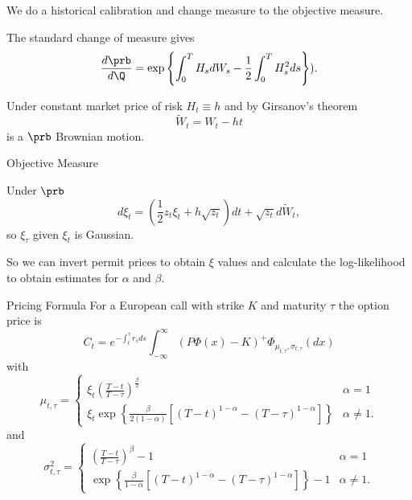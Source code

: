 
	We do a historical calibration and change measure to the objective measure.

	The standard change of measure gives
$$
\frac{d\prb}{d\Q} = \exp\left\{\int_0^T H_s dW_s -\frac{1}{2} \int_0^T H_s^2ds \right\}).
$$

Under constant market price of risk $H_t \equiv h$ and by Girsanov's theorem
$$
\tilde{W}_t = W_t - ht
$$
is a $\prb$ Brownian motion.


{Objective Measure}


Under $\prb$
$$
d\xi_t = \left(\frac{1}{2} z_t \xi_t + h \sqrt{z_t} \right)dt + \sqrt{z_t} d\tilde{W}_t,
$$
so $\xi_{\tau}$ given $\xi_t$ is Gaussian.

	So we can invert permit prices to obtain $\xi$ values and calculate the log-likelihood to obtain
estimates for $\alpha$ and $\beta$.



{Pricing Formula}
For a European call with strike $K$ and maturity $\tau$ the option price is
$$
C_t = e^{-\int_t^\tau r_s ds} \int_{-\infty}^\infty (P\Phi(x)-K)^+ \Phi_{\mu_{t,\tau}, \sigma_{t,\tau}}(dx)
$$
with
$$
\mu_{t,\tau}=
\left\{
\begin{array}{ll}
\xi_t \left(\frac{T-t}{T-\tau}\right)^{\frac{\beta}{2}} & \alpha =1\\
\xi_t \exp\left\{\frac{\beta}{2(1-\alpha)}[(T-t)^{1-\alpha}-(T-\tau)^{1-\alpha}]\right\} & \alpha \not= 1.
\end{array}
\right.
$$
and
$$
\sigma^2_{t,\tau}=
\left\{
\begin{array}{ll}
\left(\frac{T-t}{T-\tau}\right)^\beta-1 & \alpha =1\\
\exp\left\{\frac{\beta}{1-\alpha}[(T-t)^{1-\alpha}-(T-\tau)^{1-\alpha}]\right\}-1 & \alpha \not= 1.
\end{array}
\right.
$$


